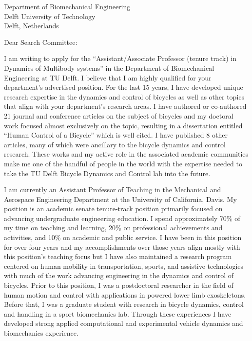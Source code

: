 \documentclass{letter}
\date{}
\begin{document}
\begin{letter}{
  Department of Biomechanical Engineering \\
  Delft University of Technology \\
  Delft, Netherlands
}

\opening{Dear Search Committee:}

I am writing to apply for the ``Assistant/Associate Professor (tenure track) in
Dynamics of Multibody systems'' in the Department of Biomechanical Engineering
at TU Delft. I believe that I am highly qualified for your department's
advertised position. For the last 15 years, I have developed unique research
expertise in the dynamics and control of bicycles as well as other topics that
align with your department's research areas. I have authored or co-authored 21
journal and conference articles on the subject of bicycles and my doctoral work
focused almost exclusively on the topic, resulting in a dissertation entitled
``Human Control of a Bicycle'' which is well cited. I have published 8 other
articles, many of which were ancillary to the bicycle dynamics and control
research. These works and my active role in the associated academic communities
make me one of the handful of people in the world with the expertise needed to
take the TU Delft Bicycle Dynamics and Control lab into the future.

I am currently an Assistant Professor of Teaching in the Mechanical and
Aerospace Engineering Department at the University of California, Davis. My
position is an academic senate tenure-track position primarily focused on
advancing undergraduate engineering education. I spend approximately 70\% of my
time on teaching and learning, 20\% on professional achievements and
activities, and 10\% on academic and public service. I have been in this
position for over four years and my accomplishments over those years align
mostly with this position's teaching focus but I have also maintained a
research program centered on human mobility in transportation, sports, and
assistive technologies with much of the work advancing engineering in the
dynamics and control of bicycles. Prior to this position, I was a postdoctoral
researcher in the field of human motion and control with applications in
powered lower limb exoskeletons. Before that, I was a graduate student with
research in bicycle dynamics, control and handling in a sport biomechanics lab.
Through these experiences I have developed strong applied computational and
experimental vehicle dynamics and biomechanics experience.


\end{letter}
\end{document}
